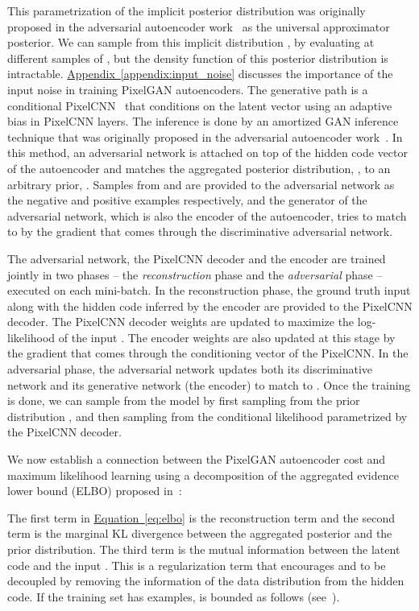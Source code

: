 \documentclass{article}
\newcommand{\myeq}[1]{\hyperref[eq:#1]{Equation~\ref*{eq:#1}}}
\newcommand{\myappendix}[1]{\hyperref[appendix:#1]{Appendix~\ref*{appendix:#1}}}
\begin{document}
This parametrization of the implicit posterior distribution was originally proposed in the adversarial autoencoder work~\citep{aae} as the universal approximator posterior. We can sample from this implicit distribution , by evaluating  at different samples of , but the density function of this posterior distribution is intractable. \myappendix{input_noise} discusses the importance of the input noise in training PixelGAN autoencoders. 
The generative path  is a conditional PixelCNN~\citep{pixelcnn} that conditions on the latent vector  using an adaptive bias in PixelCNN layers. The inference is done by an amortized GAN inference technique that was originally proposed in the adversarial autoencoder work~\citep{aae}. In this method, an adversarial network is attached on top of the hidden code vector of the autoencoder and matches the aggregated posterior distribution, , to an arbitrary prior, . Samples from  and  are provided to the adversarial network as the negative and positive examples respectively, and the generator of the adversarial network, which is also the encoder of the autoencoder, tries to match  to  by the gradient that comes through the discriminative adversarial network. 

The adversarial network, the PixelCNN decoder and the encoder are trained jointly in two phases -- the \emph{reconstruction} phase and the \emph{adversarial} phase -- executed on each mini-batch. In the reconstruction phase, the ground truth input  along with the hidden code  inferred by the encoder are provided to the PixelCNN decoder. The PixelCNN decoder weights are updated to maximize the log-likelihood of the input . The encoder weights are also updated at this stage by the gradient that comes through the conditioning vector of the PixelCNN. In the adversarial phase, the adversarial network updates both its discriminative network and its generative network (the encoder) to match  to . Once the training is done, we can sample from the model by first sampling  from the prior distribution , and then sampling from the conditional likelihood  parametrized by the PixelCNN decoder.
 


We now establish a connection between the PixelGAN autoencoder cost and maximum likelihood learning using a decomposition of the aggregated evidence lower bound (ELBO) proposed in~\citep{surgery}:

The first term in \myeq{elbo} is the reconstruction term and the second term is the marginal KL divergence between the aggregated posterior and the prior distribution. The third term is the mutual information between the latent code  and the input . This is a regularization term that encourages  and  to be decoupled by removing the information of the data distribution from the hidden code.
If the training set has  examples,  is bounded as follows (see~\citep{surgery}).
\end{document}
